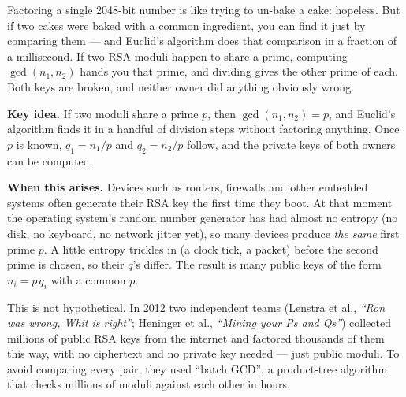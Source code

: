 \documentclass[11pt]{article}
\theoremstyle{definition}
\theoremstyle{remark}
\begin{document}
\begin{intuition}
Factoring a single 2048-bit number is like trying to un-bake a cake: hopeless. But if two cakes were baked with a common ingredient, you can find it just by comparing them --- and Euclid's algorithm does that comparison in a fraction of a millisecond. If two RSA moduli happen to share a prime, computing $\gcd(n_1,n_2)$ hands you that prime, and dividing gives the other prime of each. Both keys are broken, and neither owner did anything obviously wrong.
\end{intuition}

\textbf{Key idea.} If two moduli share a prime $p$, then $\gcd(n_1,n_2)=p$, and Euclid's algorithm finds it in a handful of division steps without factoring anything. Once $p$ is known, $q_1=n_1/p$ and $q_2=n_2/p$ follow, and the private keys of both owners can be computed.

\textbf{When this arises.} Devices such as routers, firewalls and other embedded systems often generate their RSA key the first time they boot. At that moment the operating system's random number generator has had almost no entropy (no disk, no keyboard, no network jitter yet), so many devices produce \emph{the same} first prime $p$. A little entropy trickles in (a clock tick, a packet) before the second prime is chosen, so their $q$'s differ. The result is many public keys of the form $n_i=p\,q_i$ with a common $p$.

This is not hypothetical. In 2012 two independent teams (Lenstra et al., \emph{``Ron was wrong, Whit is right''}; Heninger et al., \emph{``Mining your Ps and Qs''}) collected millions of public RSA keys from the internet and factored thousands of them this way, with no ciphertext and no private key needed --- just public moduli. To avoid comparing every pair, they used ``batch GCD'', a product-tree algorithm that checks millions of moduli against each other in hours.
\end{document}
